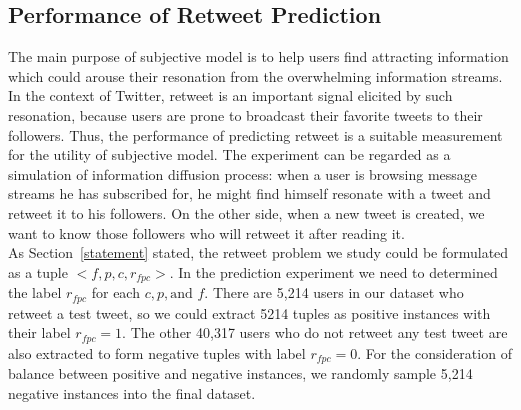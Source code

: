 \documentclass{acm_proc_article-sp}
\begin{document}
\subsection{Performance of Retweet Prediction }
\label{performance}
The main purpose of subjective model is to help users find attracting information which could arouse their resonation from the overwhelming information streams. 
In the context of Twitter, retweet is an important signal elicited by such resonation, because users are prone to broadcast their favorite tweets to their followers. 
Thus, the performance of predicting retweet is a suitable measurement for the utility of subjective model. The experiment can be regarded as a simulation of information diffusion process: when a user is browsing message streams he has subscribed for, he might find himself resonate with a tweet and retweet it to his followers. On the other side, when a new tweet is created, we want to know those followers who will retweet it after reading it.\\
As Section~\ref{statement} stated, the retweet problem we study could be formulated as a tuple $< f, p, c, r_{fpc}> $.
In the prediction experiment we need to determined the label $ r_{fpc} $ for each $ c, p, \text{and } f $. 
There are 5,214 users in our dataset who retweet a test tweet, so we could extract 5214 tuples as positive instances with their label $ r_{fpc}=1 $.
The other 40,317 users who do not retweet any test tweet are also extracted to form negative tuples with label $ r_{fpc}=0 $.
For the consideration of balance between positive and negative instances, we randomly sample 5,214 negative instances into the final dataset.
\end{document}
